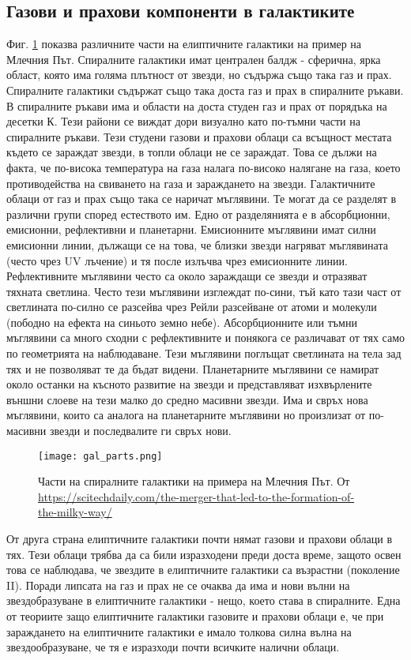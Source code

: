 \documentclass[a4paper,12pt]{article}
\begin{document}
\subsection{Газови и прахови компоненти в галактиките}
Фиг. \ref{fig:gal_parts} показва различните части на елиптичните галактики на пример на Млечния Път. Спиралните галактики имат централен балдж - сферична, ярка област, която има голяма плътност от звезди, но съдържа също така газ и прах. Спиралните галактики съдържат също така доста газ и прах в спиралните ръкави. В спиралните ръкави има и области на доста студен газ и прах от порядъка на десетки К. Тези райони се виждат дори визуално като по-тъмни части на спиралните ръкави. Тези студени газови и прахови облаци са всъщност местата където се зараждат звезди, в топли облаци не се зараждат. Това се дължи на факта, че по-висока температура на газа налага по-високо налягане на газа, което противодейства на свиването на газа и зараждането на звезди. Галактичните облаци от газ и прах също така се наричат мъглявини. Те могат да се разделят в различни групи според естеството им. Едно от разделянията е в абсорбционни, емисионни, рефлективни и планетарни. Емисионните мъглявини имат силни емисионни линии, дължащи се на това, че близки звезди нагряват мъглявината (често чрез UV лъчение) и тя после излъчва чрез емисионните линии. Рефлективните мъглявини често са около зараждащи се звезди и отразяват тяхната светлина. Често тези мъглявини изглеждат по-сини, тъй като тази част от светлината по-силно се разсейва чрез Рейли разсейване от атоми и молекули (пободно на ефекта на синьото земно небе). Абсорбционните или тъмни мъглявини са много сходни с рефлективните и понякога се различават от тях само по геометрията на наблюдаване. Тези мъглявини поглъщат светлината на тела зад тях и не позволяват те да бъдат видени. Планетарните мъглявини се намират около останки на късното развитие на звезди и представляват изхвърлените външни слоеве на тези малко до средно масивни звезди. Има и свръх нова мъглявини, които са аналога на планетарните мъглявини но произлизат от по-масивни звезди и последвалите ги свръх нови.

\begin{figure}[h!]
\centering
\texttt{[image: gal\_parts.png]}
\caption{Части на спиралните галактики на примера на Млечния Път. От \url{https://scitechdaily.com/the-merger-that-led-to-the-formation-of-the-milky-way/}}
\label{fig:gal_parts}
\end{figure}

От друга страна елиптичните галактики почти нямат газови и прахови облаци в тях. Тези облаци трябва да са били изразходени преди доста време, защото освен това се наблюдава, че звездите в елиптичните галактики са възрастни (поколение II). Поради липсата на газ и прах не се очаква да има и нови вълни на звездобразуване в елиптичните галактики - нещо, което става в спиралните. Една от теориите защо елиптичните галактики газовите и прахови облаци е, че при зараждането на елиптичните галактики е имало толкова силна вълна на звездообразуване, че тя е изразходи почти всичките налични облаци.
\end{document}
